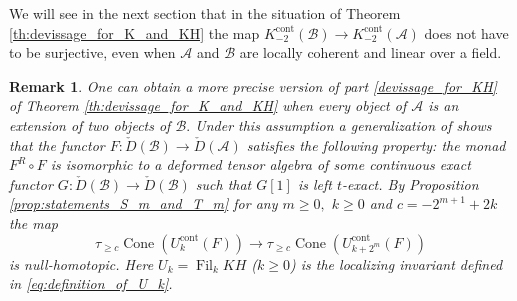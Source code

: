 \documentclass[11pt,leqno]{amsart}
\newtheorem{remark}[theo]{Remark}
\numberwithin{equation}{section}
\newcommand{\Cone}{\operatorname{Cone}}
\newcommand{\cont}{\operatorname{cont}}
\newcommand{\Fil}{\operatorname{Fil}}
\newcommand{\cA}{{\mathcal A}}
\newcommand{\cB}{{\mathcal B}}
\begin{document}
We will see in the next section that in the situation of Theorem \ref{th:devissage_for_K_and_KH} the map $K_{-2}^{\cont}(\cB)\to K_{-2}^{\cont}(\cA)$ does not have to be surjective, even when $\cA$ and $\cB$ are locally coherent and linear over a field.

\begin{remark}
One can obtain a more precise version of part \ref{devissage_for_KH} of Theorem \ref{th:devissage_for_K_and_KH} when every object of $\cA$ is an extension of two objects of $\cB.$ Under this assumption a generalization of \cite[Theorem 0.3]{E25b} shows that the functor $F:\check{D}(\cB)\to\check{D}(\cA)$ satisfies the following property: the monad $F^R\circ F$ is isomorphic to a deformed tensor algebra of some continuous exact functor $G:\check{D}(\cB)\to\check{D}(\cB)$ such that $G[1]$ is left $t$-exact. By Proposition \ref{prop:statements_S_m_and_T_m} for any $m\geq 0,$ $k\geq 0$ and $c=-2^{m+1}+2k$ the map
\begin{equation*}
\tau_{\geq c}\Cone(U_k^{\cont}(F))\to\tau_{\geq c}\Cone(U_{k+2^m}^{\cont}(F))
\end{equation*}
is null-homotopic. Here $U_k=\Fil_k KH$ ($k\geq 0$) is the localizing invariant defined in \eqref{eq:definition_of_U_k}. 
\end{remark}




\end{document}
